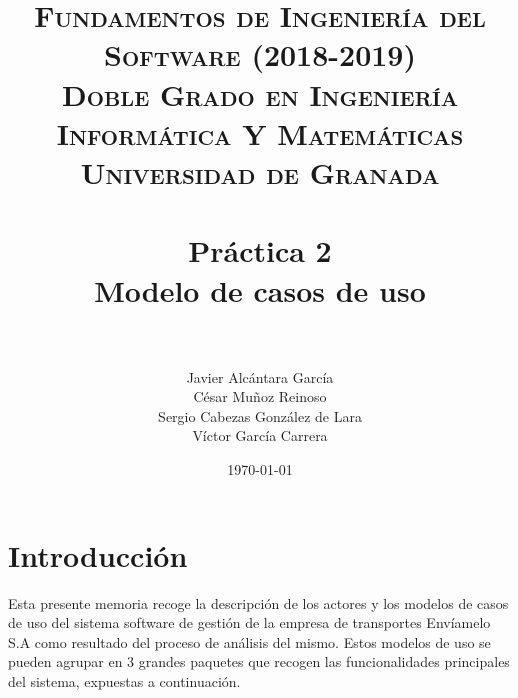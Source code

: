 



\title{	
\normalfont \normalsize 
\textsc{\textbf{Fundamentos de Ingeniería del Software (2018-2019)} \\ Doble Grado en Ingeniería Informática Y Matemáticas \\ Universidad de Granada} \\ [25pt] %
\horrule{0.5pt} \\[0.4cm] %
\huge \textbf{Práctica 2} \\ Modelo de casos de uso \\ %
\horrule{2pt} \\[0.5cm] %
}

\author{Javier Alcántara García\\ César Muñoz Reinoso \\ Sergio Cabezas González de Lara \\ Víctor García Carrera} %

\date{\normalsize\today} %





\maketitle %

\newpage %

\tableofcontents %

\newpage

\section{Introducción}
Esta presente memoria recoge la descripción de los actores y los modelos de casos de uso del sistema software de gestión de la empresa de transportes Envíamelo S.A como resultado del proceso de análisis del mismo. Estos modelos de uso se pueden agrupar en 3 grandes paquetes que recogen las funcionalidades principales del sistema, expuestas a continuación.

